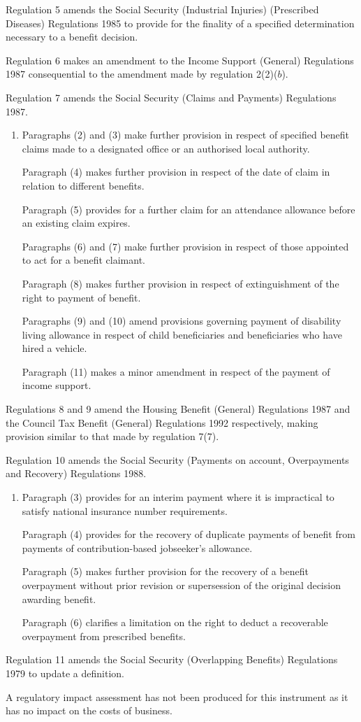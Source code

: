 \documentclass[12pt,a4paper]{article}
\begin{document}
Regulation 5 amends the Social Security (Industrial Injuries) (Prescribed Diseases) Regulations 1985 to provide for the finality of a specified determination necessary to a benefit decision.

Regulation 6 makes an amendment to the Income Support (General) Regulations 1987 consequential to the amendment made by regulation 2(2)($b$).

Regulation 7 amends the Social Security (Claims and Payments) Regulations 1987.
\begin{enumerate}\item[]
    Paragraphs (2) and (3) make further provision in respect of specified benefit claims made to a designated office or an authorised local authority.

    Paragraph (4) makes further provision in respect of the date of claim in relation to different benefits.

    Paragraph (5) provides for a further claim for an attendance allowance before an existing claim expires.

    Paragraphs (6) and (7) make further provision in respect of those appointed to act for a benefit claimant.

    Paragraph (8) makes further provision in respect of extinguishment of the right to payment of benefit.

    Paragraphs (9) and (10) amend provisions governing payment of disability living allowance in respect of child beneficiaries and beneficiaries who have hired a vehicle.

    Paragraph (11) makes a minor amendment in respect of the payment of income support. 
\end{enumerate}

Regulations 8 and 9 amend the Housing Benefit (General) Regulations 1987 and the Council Tax Benefit (General) Regulations 1992 respectively, making provision similar to that made by regulation 7(7).

Regulation 10 amends the Social Security (Payments on account, Overpayments and Recovery) Regulations 1988.
\begin{enumerate}\item[]
    Paragraph (3) provides for an interim payment where it is impractical to satisfy national insurance number requirements.

    Paragraph (4) provides for the recovery of duplicate payments of benefit from payments of contribution-based jobseeker’s allowance.

    Paragraph (5) makes further provision for the recovery of a benefit overpayment without prior revision or supersession of the original decision awarding benefit.

    Paragraph (6) clarifies a limitation on the right to deduct a recoverable overpayment from prescribed benefits. 
\end{enumerate}

Regulation 11 amends the Social Security (Overlapping Benefits) Regulations 1979 to update a definition.

A regulatory impact assessment has not been produced for this instrument as it has no impact on the costs of business. 
\end{document}
